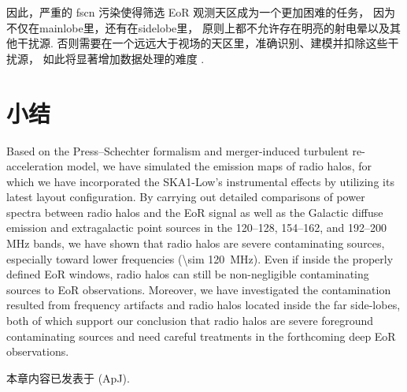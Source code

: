 因此，严重的 \ac{fscn} 污染使得筛选 EoR 观测天区成为一个更加困难的任务，
因为不仅在\ac{mainlobe}里，还有在\ac{sidelobe}里，
原则上都不允许存在明亮的射电晕以及其他干扰源.
否则需要在一个远远大于视场的天区里，准确识别、建模并扣除这些干扰源，
如此将显著增加数据处理的难度 \cite{pober2013,pober2016}.


\section{小结}

Based on the Press--Schechter formalism and merger-induced turbulent
re-acceleration model, we have simulated the emission maps of radio halos,
for which we have incorporated the SKA1-Low's instrumental effects by
utilizing its latest layout configuration.
By carrying out detailed comparisons of power spectra between radio halos
and the EoR signal as well as the Galactic diffuse emission and
extragalactic point sources in the \numrange{120}{128},
\numrange{154}{162}, and \numrange{192}{200} \si{\MHz} bands,
we have shown that radio halos are severe contaminating sources,
especially toward lower frequencies (\SI{\sim 120}{\MHz}).
Even if inside the properly defined EoR windows, radio halos can still
be non-negligible contaminating sources to EoR observations.
Moreover, we have investigated the contamination resulted from
frequency artifacts and radio halos located inside the far side-lobes,
both of which support our conclusion that radio halos are severe
foreground contaminating sources and need careful treatments in the
forthcoming deep EoR observations.

本章内容已发表于 \apj{} (ApJ).


